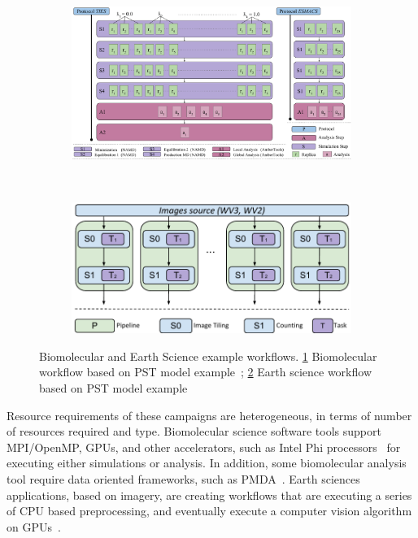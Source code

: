 \begin{figure}[ht!]
    \centering
    \begin{subfigure}[b]{0.45\textwidth}
        \includegraphics[width=\linewidth]{figures/bio_workflow.pdf}
        \caption{}
        \label{fig:bio_workflow}
    \end{subfigure}%
    ~ 
    \begin{subfigure}[b]{0.45\textwidth}
        \includegraphics[width=\linewidth]{figures/earth_workflow.pdf}
        \caption{}
        \label{fig:earth_workflow}
    \end{subfigure}
    \caption{Biomolecular and Earth Science example workflows. \ref{fig:bio_workflow} Biomolecular workflow based on PST model example~\cite{dakka2018concurrent}; \ref{fig:earth_workflow} Earth science workflow based on PST model example~\cite{paraskevakos2019workflow}}\label{fig:bio_earth_workflows}
\end{figure}

Resource requirements of these campaigns are heterogeneous, in terms of number of resources required and type. 
Biomolecular science software tools support MPI/OpenMP, GPUs, and other accelerators, such as Intel Phi processors~\cite{cheatham2015impact} for executing either simulations or analysis.
In addition, some biomolecular analysis tool require data oriented frameworks, such as PMDA~\cite{fan2019pmda}.
Earth sciences applications, based on imagery, are creating workflows that are executing a series of CPU based preprocessing, and eventually execute a computer vision algorithm on GPUs~\cite{paraskevakos2019workflow}.


